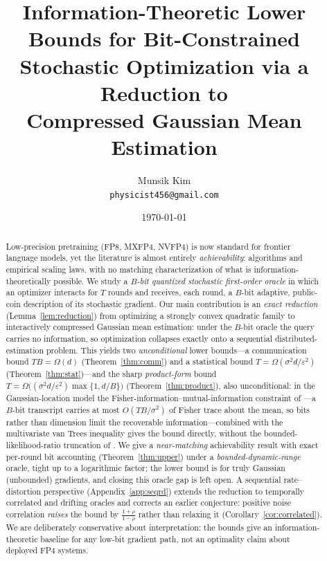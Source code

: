 \documentclass[11pt]{article}
\title{\bf Information-Theoretic Lower Bounds for Bit-Constrained\\ Stochastic Optimization via a Reduction to\\ Compressed Gaussian Mean Estimation}
\author{%
  Munsik Kim\\
  \texttt{physicist456@gmail.com}%
}
\date{\today}
\theoremstyle{definition}
\newcommand{\eps}{\varepsilon}
\begin{document}
\maketitle

\begin{abstract}
Low-precision pretraining (FP8, MXFP4, NVFP4) is now standard for frontier language models, yet the
literature is almost entirely \emph{achievability}: algorithms and empirical scaling laws, with no
matching characterization of what is information-theoretically possible. We study a \emph{$B$-bit
quantized stochastic first-order oracle} in which an optimizer interacts for $T$ rounds and receives,
each round, a $B$-bit adaptive, public-coin description of its stochastic gradient. Our main
contribution is an \emph{exact reduction} (Lemma~\ref{lem:reduction}) from optimizing a strongly convex
quadratic family to interactively compressed Gaussian mean estimation: under the $B$-bit oracle the
query carries no information, so optimization collapses exactly onto a sequential distributed-estimation
problem. This yields two \emph{unconditional} lower bounds---a communication bound $TB=\Omega(d)$
(Theorem~\ref{thm:comm}) and a statistical bound $T=\Omega(\sigma^2 d/\eps^2)$
(Theorem~\ref{thm:stat})---and the sharp \emph{product-form} bound
$T=\Omega\!\big((\sigma^2 d/\eps^2)\max\{1,d/B\}\big)$ (Theorem~\ref{thm:product}), also unconditional:
in the Gaussian-location model the Fisher-information--mutual-information constraint of
\citet{barnes2021fisher}---a $B$-bit transcript carries at most $O(TB/\sigma^2)$ of Fisher trace about
the mean, so bits rather than dimension limit the recoverable information---combined with the
multivariate van Trees inequality \citep{gilllevit1995} gives the bound directly, without the
bounded-likelihood-ratio truncation of \citet{braverman2016ddpi}. We give a \emph{near-matching}
achievability result with exact per-round bit accounting (Theorem~\ref{thm:upper}) under a
\emph{bounded-dynamic-range} oracle, tight up to a logarithmic factor; the lower bound is for truly
Gaussian (unbounded) gradients, and closing this oracle gap is left open. A sequential
rate--distortion perspective (Appendix~\ref{app:seqrd}) extends the reduction to temporally correlated
and drifting oracles and corrects an earlier conjecture: positive noise correlation \emph{raises} the
bound by $\tfrac{1+\rho}{1-\rho}$ rather than relaxing it (Corollary~\ref{cor:correlated}). We are
deliberately conservative about interpretation: the bounds give an information-theoretic baseline for
any low-bit gradient path, not an optimality claim about deployed FP4 systems.
\end{abstract}
\end{document}
